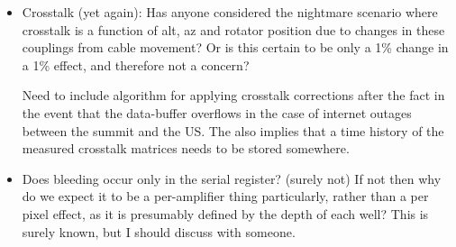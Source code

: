 \begin{itemize}
	\item  Crosstalk (yet again): Has anyone considered the nightmare scenario where crosstalk is a function of alt, az and rotator position due to changes in these couplings from cable movement? Or is this certain to be only a 1\% change in a 1\% effect, and therefore not a concern?
	
	\begin{note}
		Need to include algorithm for applying crosstalk corrections after the fact in the event that the data-buffer overflows in the case of internet outages between the summit and the US. The also implies that a time history of the measured crosstalk matrices needs to be stored somewhere.
	\end{note}
		
	\item Does bleeding occur only in the serial register? (surely not) If not then why do we expect it to be a per-amplifier thing particularly, rather than a per pixel effect, as it is presumably defined by the depth of each well? This is surely known, but I should discuss with someone.
	
\end{itemize}






\clearpage


































